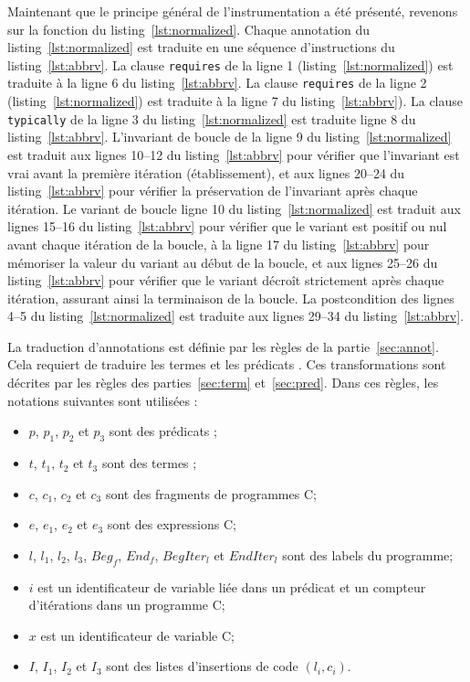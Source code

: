 Maintenant que le principe général de l'instrumentation a été présenté, revenons
sur la fonction du listing~\ref{lst:normalized}.
Chaque annotation du listing~\ref{lst:normalized} est traduite en une séquence
d'instructions du listing~\ref{lst:abbrv}.
La clause \lstinline'requires' de la ligne 1 (listing~\ref{lst:normalized}) est
traduite à la ligne 6 du listing~\ref{lst:abbrv}.
La clause \lstinline'requires' de la ligne 2 (listing~\ref{lst:normalized}) est
traduite à la ligne 7 du listing~\ref{lst:abbrv}).
La clause \lstinline'typically' de la ligne 3 du listing~\ref{lst:normalized}
est traduite ligne 8 du listing~\ref{lst:abbrv}.
L'invariant de boucle de la ligne 9 du listing~\ref{lst:normalized} est traduit
aux lignes 10--12 du listing~\ref{lst:abbrv} pour vérifier que l'invariant est
vrai avant la première itération (établissement), et aux lignes 20--24 du
listing~\ref{lst:abbrv} pour vérifier la préservation de l'invariant après
chaque itération.
Le variant de boucle ligne 10 du listing~\ref{lst:normalized} est traduit aux
lignes 15--16 du listing~\ref{lst:abbrv} pour vérifier que le variant est
positif ou nul avant chaque itération de la boucle, à la ligne 17 du
listing~\ref{lst:abbrv} pour mémoriser la valeur du variant au début de la
boucle, et aux lignes 25--26 du listing~\ref{lst:abbrv} pour vérifier que le
variant décroît strictement après chaque itération, assurant ainsi la
terminaison de la boucle.
La postcondition des lignes 4--5 du listing~\ref{lst:normalized} est traduite
aux lignes 29--34 du listing~\ref{lst:abbrv}.

La traduction d'annotations est définie par les règles de la
partie~\ref{sec:annot}.
Cela requiert de traduire les termes et les prédicats \eacsl.
Ces transformations sont décrites par les règles des parties~\ref{sec:term}
et~\ref{sec:pred}.
Dans ces règles, les notations suivantes sont utilisées :
\begin{itemize}
\item $p$, $p_1$, $p_2$ et $p_3$ sont des prédicats \eacsl;
\item $t$, $t_1$, $t_2$ et $t_3$ sont des termes \eacsl;
\item $c$, $c_1$, $c_2$ et $c_3$ sont des fragments de programmes C;
\item $e$, $e_1$, $e_2$ et $e_3$ sont des expressions C;
\item $l$, $l_1$, $l_2$, $l_3$, $Beg_f$, $End_f$, $BegIter_l$ et $EndIter_l$ sont
  des labels du programme;
\item $i$ est un identificateur de variable liée dans un prédicat \eacsl et un
  compteur d'itérations dans un programme C;
\item $x$ est un identificateur de variable C;
\item $I$, $I_1$, $I_2$ et $I_3$ sont des listes d'insertions de code
  $(l_i, c_i)$.
\end{itemize}

